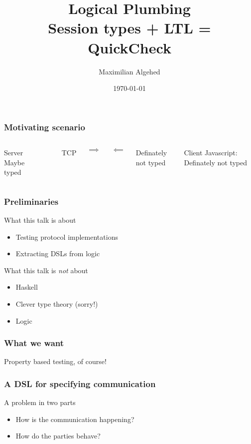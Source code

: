 \documentclass{beamer}
\title[Logical Plumbing]{Logical Plumbing  \\ \large{Session types + LTL = QuickCheck}}
\author{Maximilian Algehed} %
\institute[CTH] %
{
Chalmers University of Technology \\ %
\medskip
\textit{m.algehed@gmail.com} %
}
\date{\today} %
\begin{document}
\begin{frame}
    \titlepage %
\end{frame}

\begin{frame}
    \frametitle{Motivating scenario}
    \begin{columns}
        \begin{block}{Server}
            \small{Maybe typed}
        \end{block}

        \\
        \centerline{TCP}
        \centerline{\Large{$\implies$}}
        \centerline{\Large{$\impliedby$}}
        \centerline{Definately not typed}

        \begin{block}{Client}
            \small{Javascript: Definately not typed}
        \end{block}
        
    \end{columns}
\end{frame}

\begin{frame}
    \frametitle{Preliminaries}
    \Large{What this talk is about}
    \begin{itemize}
        \item Testing protocol implementations
        \item Extracting DSLs from logic
    \end{itemize}
    \pause
    \Large{What this talk is \emph{not} about}
    \begin{itemize}
        \item Haskell
        \item Clever type theory (sorry!)
        \item Logic
    \end{itemize}
\end{frame}


\begin{frame}
    \frametitle{What we want}
    \centering
    \Large{Property based testing, of course!}
\end{frame}

\begin{frame}
    \frametitle{A DSL for specifying communication}
    \centering
    \Large{A problem in two parts}
    \begin{itemize}
        \item How is the communication happening?
        \item How do the parties behave?
    \end{itemize}
\end{frame}
\end{document}
